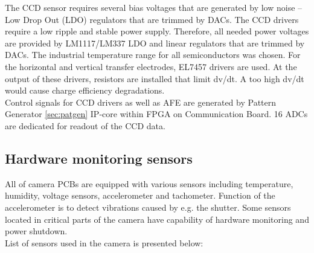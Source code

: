 The CCD sensor requires several bias voltages that are generated by low noise – Low Drop Out (LDO) regulators that are trimmed by DACs.
The CCD drivers require a low ripple and stable power supply. Therefore, all needed power voltages are provided by LM1117/LM337 LDO and linear regulators that are trimmed by DACs. The industrial temperature range for all semiconductors was chosen.
For the horizontal and vertical transfer electrodes, EL7457 drivers are used. At the output of these drivers, resistors are installed that limit dv/dt. A too high dv/dt would cause charge efficiency degradations. \\
Control signals for CCD drivers as well as AFE are generated by Pattern Generator \ref{sec:patgen} IP-core within FPGA on Communication Board. 16 ADCs are dedicated for readout of the CCD data. \\

\subsection{Hardware monitoring sensors}
All of camera PCBs are equipped with various sensors including temperature, humidity, voltage sensors, accelerometer and tachometer. Function of the accelerometer is to detect vibrations caused by e.g. the shutter. Some sensors located in critical parts of the camera have capability of hardware monitoring and power shutdown. \\
List of sensors used in the camera is presented below:

